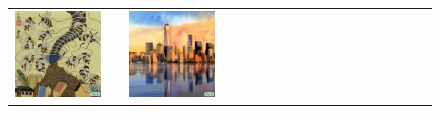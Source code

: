 \begin{figure}[ht!]
\begin{adjustwidth}{-0.8in}{-0.5in}
\begin{tabular}{cccccccccccccccccccc}
\multicolumn{2}{c}{\includegraphics[width=\threebythreecolwidth\textwidth]{figures/cherries/bees_hokusai.jpg}} &&
\multicolumn{2}{c}{\includegraphics[width=\threebythreecolwidth\textwidth]{figures/cherries/ink_1_manhattan.jpg}} &

\end{tabular}
\end{adjustwidth}
\end{figure}
